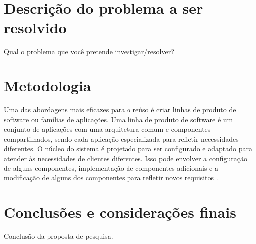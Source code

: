 \documentclass[10pt,a4paper]{article}
\begin{document}
\section{Descrição do problema a ser resolvido}
Qual o problema que você pretende investigar/resolver?

\section{Metodologia}
Uma das abordagens mais eficazes para o reúso é criar linhas de produto de software ou famílias de aplicações. Uma linha de produto de software é um conjunto de aplicações com uma arquitetura comum e componentes compartilhados, sendo cada aplicação especializada para refletir necessidades diferentes. O núcleo do sistema é projetado para ser configurado e adaptado para atender às necessidades de clientes diferentes. Isso pode envolver a configuração de alguns componentes, implementação de componentes adicionais e a modificação de alguns dos componentes para refletir novos requisitos \cite{Sommerville2011}.

\section{Conclusões e considerações finais}
Conclusão da proposta de pesquisa.




\end{document}
